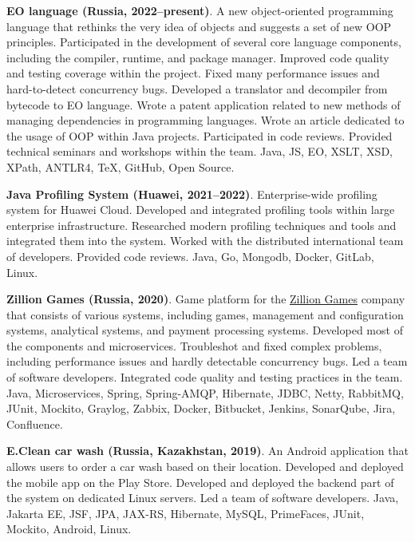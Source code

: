 \documentclass{vl}
\begin{document}
    \textbf{EO language (Russia, 2022--present)}.
    A new object-oriented programming language
    that rethinks the very idea of objects and suggests a set of new OOP principles.
    Participated in the development of several core language components,
    including the compiler, runtime, and package manager.
    Improved code quality and testing coverage within the project.
    Fixed many performance issues and hard-to-detect concurrency bugs.
    Developed a translator and decompiler from bytecode to EO language.
    Wrote a patent application related to new methods of managing dependencies in programming languages.
    Wrote an article dedicated to the usage of OOP within Java projects.
    Participated in code reviews.
    Provided technical seminars and workshops within the team.
    Java, JS, EO, XSLT, XSD, XPath, ANTLR4, TeX, GitHub, Open Source.

    \textbf{Java Profiling System (Huawei, 2021--2022)}.
    Enterprise-wide profiling system for Huawei Cloud.
    Developed and integrated profiling tools within large enterprise infrastructure.
    Researched modern profiling techniques and tools and integrated them into the system.
    Worked with the distributed international team of developers.
    Provided code reviews.
    Java, Go, Mongodb, Docker, GitLab, Linux.

    \textbf{Zillion Games (Russia, 2020)}.
    Game platform for the \href{http://zillion.games/}{Zillion Games} company that consists of various systems,
    including games, management and configuration systems, analytical systems, and payment processing systems.
    Developed most of the components and microservices.
    Troubleshot and fixed complex problems, including performance issues and hardly detectable concurrency bugs.
    Led a team of software developers.
    Integrated code quality and testing practices in the team.
    Java, Microservices, Spring, Spring-AMQP, Hibernate, JDBC, Netty, RabbitMQ, JUnit, Mockito, Graylog, Zabbix, Docker,
    Bitbucket, Jenkins, SonarQube, Jira, Confluence.

    \textbf{E.Clean car wash (Russia, Kazakhstan, 2019)}.
    An Android application that allows users to order a car wash based on their location.
    Developed and deployed the mobile app on the Play Store.
    Developed and deployed the backend part of the system on dedicated Linux servers.
    Led a team of software developers.
    Java, Jakarta EE, JSF, JPA, JAX-RS, Hibernate, MySQL, PrimeFaces, JUnit, Mockito, Android, Linux.
\end{document}
